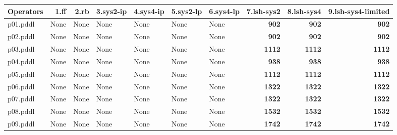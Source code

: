 \documentclass{article}
\begin{document}
\begin{tabular}{@{}lrrrrrrrrr@{}}
Operators & 1.ff & 2.rb & 3.sys2-ip & 4.sys4-ip & 5.sys2-lp & 6.sys4-lp & 7.lsh-sys2 & 8.lsh-sys4 & 9.lsh-sys4-limited \\
\midrule
p01.pddl & \multicolumn{1}{|l|}{None} & \multicolumn{1}{|l|}{None} & \multicolumn{1}{|l|}{None} & \multicolumn{1}{|l|}{None} & \multicolumn{1}{|l|}{None} & \multicolumn{1}{|l|}{None} & \textbf{902} & \textbf{902} & \textbf{902} \\
p02.pddl & \multicolumn{1}{|l|}{None} & \multicolumn{1}{|l|}{None} & \multicolumn{1}{|l|}{None} & \multicolumn{1}{|l|}{None} & \multicolumn{1}{|l|}{None} & \multicolumn{1}{|l|}{None} & \textbf{902} & \textbf{902} & \textbf{902} \\
p03.pddl & \multicolumn{1}{|l|}{None} & \multicolumn{1}{|l|}{None} & \multicolumn{1}{|l|}{None} & \multicolumn{1}{|l|}{None} & \multicolumn{1}{|l|}{None} & \multicolumn{1}{|l|}{None} & \textbf{1112} & \textbf{1112} & \textbf{1112} \\
p04.pddl & \multicolumn{1}{|l|}{None} & \multicolumn{1}{|l|}{None} & \multicolumn{1}{|l|}{None} & \multicolumn{1}{|l|}{None} & \multicolumn{1}{|l|}{None} & \multicolumn{1}{|l|}{None} & \textbf{938} & \textbf{938} & \textbf{938} \\
p05.pddl & \multicolumn{1}{|l|}{None} & \multicolumn{1}{|l|}{None} & \multicolumn{1}{|l|}{None} & \multicolumn{1}{|l|}{None} & \multicolumn{1}{|l|}{None} & \multicolumn{1}{|l|}{None} & \textbf{1112} & \textbf{1112} & \textbf{1112} \\
p06.pddl & \multicolumn{1}{|l|}{None} & \multicolumn{1}{|l|}{None} & \multicolumn{1}{|l|}{None} & \multicolumn{1}{|l|}{None} & \multicolumn{1}{|l|}{None} & \multicolumn{1}{|l|}{None} & \textbf{1322} & \textbf{1322} & \textbf{1322} \\
p07.pddl & \multicolumn{1}{|l|}{None} & \multicolumn{1}{|l|}{None} & \multicolumn{1}{|l|}{None} & \multicolumn{1}{|l|}{None} & \multicolumn{1}{|l|}{None} & \multicolumn{1}{|l|}{None} & \textbf{1322} & \textbf{1322} & \textbf{1322} \\
p08.pddl & \multicolumn{1}{|l|}{None} & \multicolumn{1}{|l|}{None} & \multicolumn{1}{|l|}{None} & \multicolumn{1}{|l|}{None} & \multicolumn{1}{|l|}{None} & \multicolumn{1}{|l|}{None} & \textbf{1532} & \textbf{1532} & \textbf{1532} \\
p09.pddl & \multicolumn{1}{|l|}{None} & \multicolumn{1}{|l|}{None} & \multicolumn{1}{|l|}{None} & \multicolumn{1}{|l|}{None} & \multicolumn{1}{|l|}{None} & \multicolumn{1}{|l|}{None} & \textbf{1742} & \textbf{1742} & \textbf{1742} \\

\end{tabular}
\end{document}
